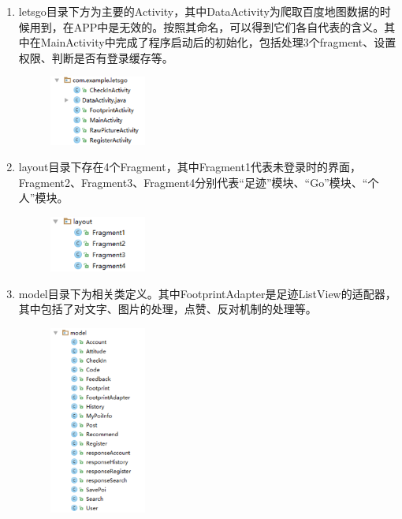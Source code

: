 \documentclass[UTF8]{article}
\begin{document}
\begin{enumerate}
    \item letsgo目录下方为主要的Activity，其中DataActivity为爬取百度地图数据的时候用到，在APP中是无效的。按照其命名，可以得到它们各自代表的含义。其中在MainActivity中完成了程序启动后的初始化，包括处理3个fragment、设置权限、判断是否有登录缓存等。
    \begin{figure}[H]
    \center
    \includegraphics[width=0.3\textwidth]{images/client2.png}
    \end{figure}

    \item layout目录下存在4个Fragment，其中Fragment1代表未登录时的界面，Fragment2、Fragment3、Fragment4分别代表“足迹”模块、“Go”模块、“个人”模块。
    \begin{figure}[H]
    \center
    \includegraphics[width=0.3\textwidth]{images/client3.png}
    \end{figure}

    \item model目录下为相关类定义。其中FootprintAdapter是足迹ListView的适配器，其中包括了对文字、图片的处理，点赞、反对机制的处理等。
    \begin{figure}[H]
    \center
    \includegraphics[width=0.3\textwidth]{images/client4.png}
    \end{figure}


\end{enumerate}
\end{document}

